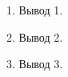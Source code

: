 \documentclass[../main.tex]{subfiles}
\begin{document}
1. Вывод 1.

2. Вывод 2.

3. Вывод 3.
\end{document}
